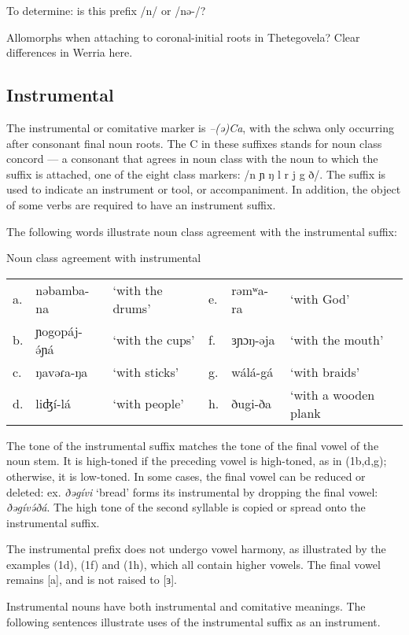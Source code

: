To determine: is this prefix /n/ or /nə-/?

Allomorphs when attaching to coronal-initial roots in Thetegovela? Clear differences in Werria here.


\subsection{Instrumental}

The instrumental or comitative marker is \textit{–(ə)Ca}, with the schwa only occurring after consonant final noun roots. The C in these suffixes stands for noun class concord --- a consonant that agrees in noun class with the noun to which the suffix is attached, one of the eight class markers: /n ɲ ŋ l r j g ð/. The suffix is used to indicate an instrument or tool, or accompaniment. In addition, the object of some verbs are required to have an instrument suffix. 

The following words illustrate noun class agreement with the instrumental suffix:

\ea	Noun class agreement with instrumental\\
\begin{tabular}[t]{llllll}
a.	&	nəbamba-na	&	‘with the drums’	&	e.	&	rəmʷa-ra		&	‘with God’\\
b.	&	ɲogopáj-ə́ɲá	&	‘with the cups’		&	f.	&	ɜɲɔŋ-əja		&	‘with the mouth’\\
c.	&	ŋavəɾa-ŋa	&	‘with sticks’		&	g.	&	wálá-gá		&	‘with braids’\\ %
d.	&	liʤí-lá		&	‘with people’		&	h.	&	ðugi-ða		&	‘with a wooden plank\\
\end{tabular}
\z 

The tone of the instrumental suffix matches the tone of the final vowel of the noun stem. It is high-toned if the preceding vowel is high-toned, as in (1b,d,g); otherwise, it is low-toned.  In some cases, the final vowel can be reduced or deleted: ex. \textit{ðəgívi} ‘bread’ forms its instrumental by dropping the final vowel: \textit{ðəgívə́ðá}. The high tone of the second syllable is copied or spread onto the instrumental suffix. 

The instrumental prefix does not undergo vowel harmony, as illustrated by the examples (1d), (1f) and (1h), which all contain higher vowels. The final vowel remains [a], and is not raised to [ɜ]. 

Instrumental nouns have both instrumental and comitative meanings. The following sentences illustrate uses of the instrumental suffix as an instrument. 

